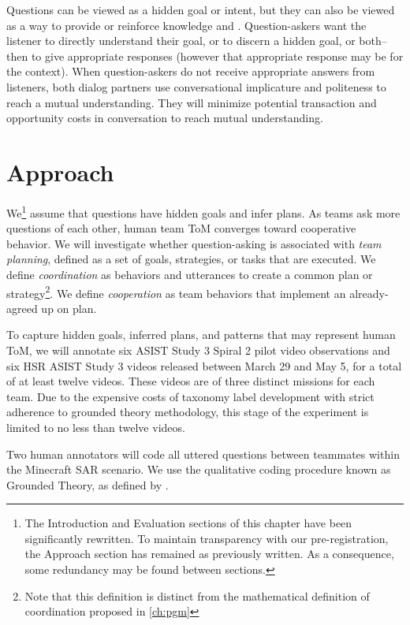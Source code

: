 Questions can be viewed as a hidden goal or intent, but they can also be viewed as a way to provide or reinforce knowledge \citep{alaimi_2020} and \citep{ray_2001}. Question-askers want the listener to directly understand their goal, or to discern a hidden goal, or both-- then to give appropriate responses (however that appropriate response may be for the context). When question-askers do not receive appropriate answers from listeners, both dialog partners use conversational implicature and politeness to reach a mutual understanding. They will minimize potential transaction and opportunity costs in conversation to reach mutual understanding.  




\section{Approach}

We\footnote{The Introduction and Evaluation sections of this chapter have been significantly rewritten. To maintain transparency with our pre-registration, the Approach section has remained as previously written. As a consequence, some redundancy may be found between sections.} assume that questions have hidden goals and infer plans. As teams ask more
questions of each other, human team ToM converges toward cooperative behavior.
We will investigate whether question-asking is associated with \emph{team
planning}, defined as a set of goals, strategies, or tasks that are executed.
We define \emph{coordination} as behaviors and utterances to create a common
plan or strategy\footnote{Note that this definition is distinct from the mathematical
definition of coordination proposed in \autoref{ch:pgm}}. We define
\emph{cooperation} as team behaviors that implement an already-agreed up on
plan.

To capture hidden goals, inferred plans, and patterns that may represent human
ToM, we will annotate six ASIST Study 3 Spiral 2 pilot video observations and
six HSR ASIST Study 3 videos released between March 29 and May 5, for a total
of at least twelve videos. These videos are of three distinct missions for each
team. Due to the expensive costs of taxonomy label development with strict
adherence to grounded theory methodology, this stage of the experiment is
limited to no less than twelve videos. 

Two human annotators will code all uttered questions between teammates within
the Minecraft SAR scenario.  We use the qualitative coding procedure known as
Grounded Theory, as defined by \citep{corbin_strauss_2015}. 

